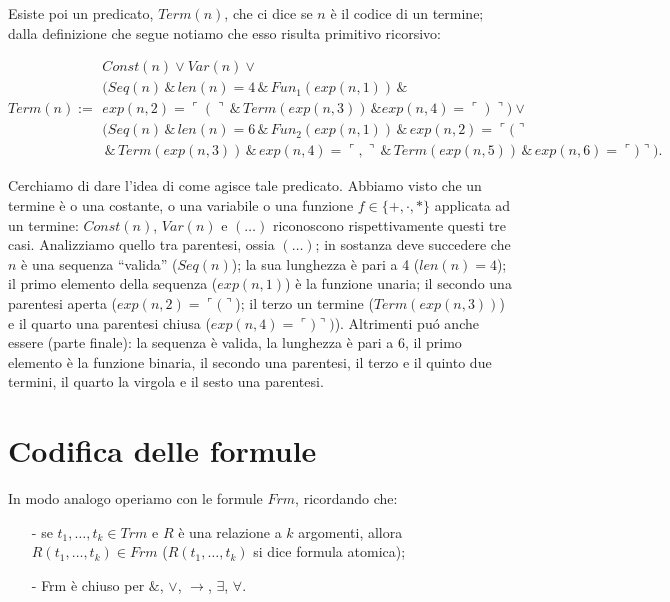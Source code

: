 Esiste poi un predicato, $Term(n)$, che ci dice se $n$ \`e il codice di un termine; dalla definizione che segue notiamo che esso risulta primitivo ricorsivo:

\small{
\begin{displaymath}
 Term(n) := \left. \begin{array}{l}  Const(n) \vee Var(n) \vee\\
(Seq(n) \, \& \, len(n) = 4 \,\& \, Fun_1(exp(n,1)) \,\& \\
exp(n,2) = \ulcorner ( \urcorner \,\&\, Term(exp(n,3)) \,\&
exp(n,4) = \ulcorner ) \urcorner) \vee \\
(Seq(n) \, \& \, len (n)=6 \, \& \, Fun_2(exp(n,1)) \,\&\, exp(n,2)= \ulcorner ( \urcorner  \\
\,\&\,Term(exp(n,3)) \,\&\, exp(n,4) = \ulcorner , \urcorner \,\&\,Term(exp(n,5)) \,\&\, exp(n,6) = \ulcorner ) \urcorner
).
\end{array} \right.
\end{displaymath}
}

Cerchiamo di dare l'idea di come agisce tale predicato. Abbiamo visto che un termine \`e o una costante, o una variabile o una funzione $f\in \{+, \cdot, *\}$ applicata ad un termine: $Const(n)$, $Var(n)$ e $(\dots)$ riconoscono rispettivamente questi tre casi. Analizziamo quello tra parentesi, ossia $(\dots)$; in sostanza  deve succedere che
$n$ \`e una sequenza ``valida'' ($Seq(n)$); la sua lunghezza \`e pari a 4 ($len(n)=4$); il primo elemento della sequenza ($exp(n,1)$) \`e la funzione unaria; il secondo una parentesi aperta ($exp(n,2) = \ulcorner ( \urcorner$); il terzo un termine ($Term(exp(n,3))$) e il quarto una parentesi chiusa ($exp(n,4) = \ulcorner ) \urcorner)$).
Altrimenti pu\'o anche essere (parte finale): la sequenza \`e valida, la lunghezza \`e pari a 6, il primo elemento \`e la funzione binaria, il secondo una parentesi, il terzo e il quinto due termini, il quarto la virgola e il sesto una parentesi.


\section{Codifica delle formule}

In modo analogo operiamo con le formule $Frm$, ricordando che:
\begin{itemize}
\item[-]{se $t_1,\dots, t_k \in Trm$ e $R$ \`e una relazione a $k$ argomenti, allora $R(t_1,\dots, t_k) \in Frm$ ($R(t_1,\dots, t_k)$ si dice formula atomica)};
\item[-]{Frm \`e chiuso per $\&$, $\vee$, $\rightarrow$, $\exists$, $\forall$}.
\end{itemize}

